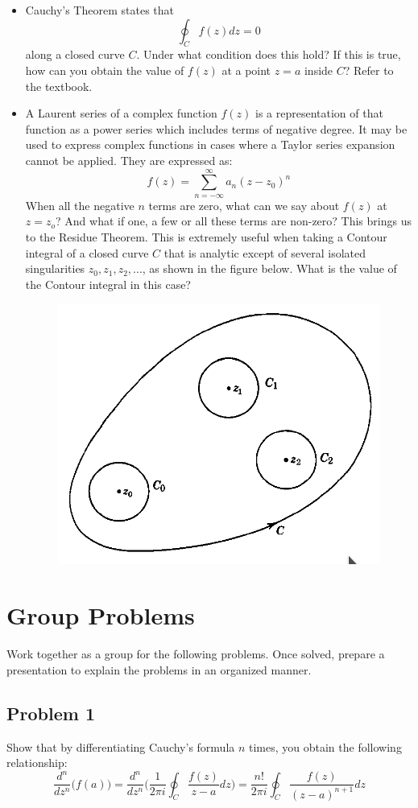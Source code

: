 \documentclass{article}
\begin{document}
\begin{itemize}
\item Cauchy's Theorem states that
\begin{equation}
    \oint_C f(z)dz=0
\end{equation}
along a closed curve $C$. Under what condition does this hold? If this is true, how can you obtain the value of $f(z)$ at a point $z=a$ inside $C$? Refer to the textbook.
\item A Laurent series of a complex function $f(z)$ is a representation of that function as a power series which includes terms of negative degree. It may be used to express complex functions in cases where a Taylor series expansion cannot be applied. They are expressed as:
\begin{equation}
    f(z) = \sum_{n=-\infty}^{\infty} a_n(z-z_0)^n
\end{equation}
When all the negative $n$ terms are zero, what can we say about $f(z)$ at $z=z_o$? And what if one, a few or all these terms are non-zero? This brings us to the Residue Theorem. This is extremely useful when taking a Contour integral of a closed curve $C$ that is analytic except of several isolated singularities $z_0, z_1, z_2,...$, as shown in the figure below. What is the value of the Contour integral in this case?
\begin{figure}[h]
    \centering
    \includegraphics[width=.2\linewidth]{P4}
\end{figure}
 \end{itemize}
  

  \section{Group Problems}
  Work together as a group for the following problems. Once solved, prepare a presentation to explain the problems in an organized manner.
  \subsection{Problem 1}
  Show that by differentiating Cauchy's formula $n$ times, you obtain the following relationship:
  \begin{equation}
      \frac{d^n}{dz^n}\Bigg(f(a)\Bigg)=\frac{d^n}{dz^n}\Bigg(\frac{1}{2\pi i}\oint_C \frac{f(z)}{z-a}dz\Bigg)=\frac{n!}{2\pi i}\oint_C \frac{f(z)}{(z-a)^{n+1}}dz
  \end{equation}
\end{document}
